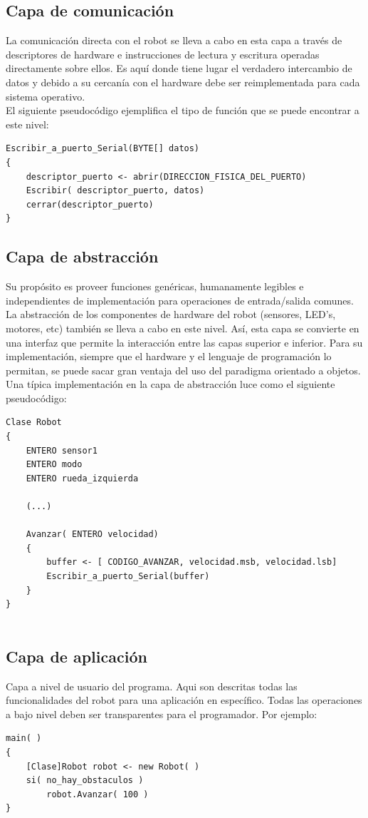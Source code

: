 \documentclass[letterpaper,openright,12pt]{book}
\begin{document}
\subsection{Capa de comunicación}
La comunicación directa con el robot se lleva a cabo en esta capa a través de descriptores de hardware e instrucciones de lectura y escritura operadas directamente sobre ellos. Es aquí donde tiene lugar el verdadero intercambio de datos y debido a su cercanía con el hardware debe ser reimplementada para cada sistema operativo.\\
El siguiente pseudocódigo ejemplifica el tipo de función que se puede encontrar a este nivel:
\begin{lstlisting}
Escribir_a_puerto_Serial(BYTE[] datos)
{
	descriptor_puerto <- abrir(DIRECCION_FISICA_DEL_PUERTO)
	Escribir( descriptor_puerto, datos)
	cerrar(descriptor_puerto)
}

\end{lstlisting}
\subsection{Capa de abstracción}
Su propósito es proveer funciones genéricas, humanamente legibles e independientes de implementación para operaciones de entrada/salida comunes. La abstracción de los componentes de hardware del robot (sensores, LED's, motores, etc) también se lleva a cabo en este nivel. Así, esta capa se convierte en una interfaz que permite la interacción entre las capas superior e inferior. Para su implementación, siempre que el hardware y el lenguaje de programación lo permitan, se puede sacar gran ventaja del uso del paradigma orientado a objetos. Una típica implementación en la capa de abstracción luce como el siguiente pseudocódigo:

\begin{lstlisting}
Clase Robot
{
	ENTERO sensor1
	ENTERO modo
	ENTERO rueda_izquierda

	(...)
	
	Avanzar( ENTERO velocidad)
	{
 		buffer <- [ CODIGO_AVANZAR, velocidad.msb, velocidad.lsb]
		Escribir_a_puerto_Serial(buffer)
	}
}


\end{lstlisting}

\subsection{Capa de aplicación}
Capa a nivel de usuario del programa. Aqui son descritas todas las funcionalidades del robot para una aplicación en específico. Todas las operaciones a bajo nivel deben ser transparentes para el programador. Por ejemplo:\\
\begin{lstlisting}
main( )
{
	[Clase]Robot robot <- new Robot( ) 
	si( no_hay_obstaculos )
		robot.Avanzar( 100 )
}



\end{lstlisting}
\end{document}

